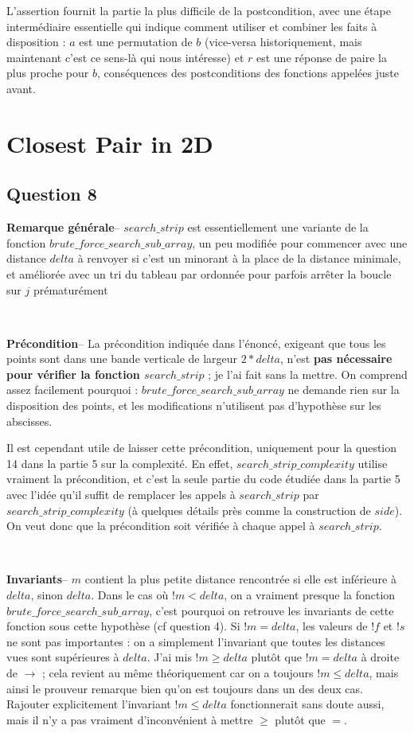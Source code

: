 \documentclass[11pt, openany, titlepage]{article}
\newcommand{\paragraphtitle}[1]{\textbf{#1}\;\;--\;}
\begin{document}
L'assertion fournit la partie la plus difficile de la postcondition, avec une étape intermédiaire essentielle qui indique comment utiliser et combiner les faits à disposition : $a$ est une permutation de $b$ (vice-versa historiquement, mais maintenant c'est ce sens-là qui nous intéresse) et $r$ est une réponse de paire la plus proche pour $b$, conséquences des postconditions des fonctions appelées juste avant.



\section{Closest Pair in 2D}

\subsection{Question 8}

\paragraphtitle{Remarque générale}
$search\_strip$ est essentiellement une variante de la fonction $brute\_force\_search\_sub\_array$, un peu modifiée pour commencer avec une distance $delta$ à renvoyer si c'est un minorant à la place de la distance minimale, et améliorée avec un tri du tableau par ordonnée pour parfois arrêter la boucle sur $j$ prématurément

\

\paragraphtitle{Précondition}
La précondition indiquée dans l'énoncé, exigeant que tous les points sont dans une bande verticale de largeur $2*delta$, n'est \textbf{pas nécessaire pour vérifier la fonction $search\_strip$} ; je l'ai fait sans la mettre. On comprend assez facilement pourquoi : $brute\_force\_search\_sub\_array$ ne demande rien sur la disposition des points, et les modifications n'utilisent pas d'hypothèse sur les abscisses.

Il est cependant utile de laisser cette précondition, uniquement pour la question 14 dans la partie 5 sur la complexité. En effet, $search\_strip\_complexity$ utilise vraiment la précondition, et c'est la seule partie du code étudiée dans la partie 5 avec l'idée qu'il suffit de remplacer les appels à $search\_strip$ par $search\_strip\_complexity$ (à quelques détails près comme la construction de $side$). On veut donc que la précondition soit vérifiée à chaque appel à $search\_strip$.

\

\paragraphtitle{Invariants}
$m$ contient la plus petite distance rencontrée si elle est inférieure à $delta$, sinon $delta$. Dans le cas où $!m<delta$, on a vraiment presque la fonction $brute\_force\_search\_sub\_array$, c'est pourquoi on retrouve les invariants de cette fonction sous cette hypothèse (cf question 4). Si $!m=delta$, les valeurs de $!f$ et $!s$ ne sont pas importantes : on a simplement l'invariant que toutes les distances vues sont supérieures à $delta$. J'ai mis $!m\geq delta$ plutôt que $!m=delta$ à droite de $\rightarrow$ ; cela revient au même théoriquement car on a toujours $!m\leq delta$, mais ainsi le prouveur remarque bien qu'on est toujours dans un des deux cas. Rajouter explicitement l'invariant $!m\leq delta$ fonctionnerait sans doute aussi, mais il n'y a pas vraiment d'inconvénient à mettre $\geq$ plutôt que $=$.
\end{document}
